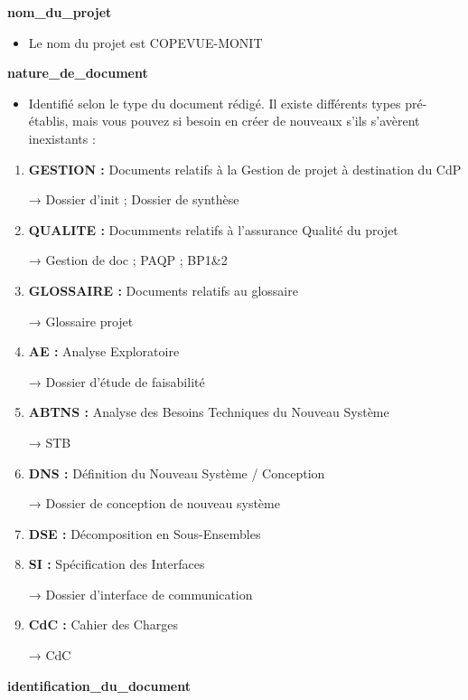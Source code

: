 \documentclass{mise_en_page}
\begin{document}
\textbf{nom\_du\_projet}

\begin{itemize}
\item Le nom du projet est COPEVUE-MONIT
\end{itemize}



\textbf{nature\_de\_document}

\begin{itemize}
\item Identifié selon le type du document rédigé. Il existe différents
types pré-établis, mais vous pouvez si besoin en créer de nouveaux
s’ils s’avèrent inexistants :
\end{itemize}
\begin{enumerate}
\item \textbf{GESTION :} Documents relatifs à la Gestion de projet à destination
du CdP

→ Dossier d’init ; Dossier de synthèse
\item \textbf{QUALITE :} Documments relatifs à l’assurance Qualité du projet

→ Gestion de doc ; PAQP ; BP1\&2

\item \textbf{GLOSSAIRE :} Documents relatifs au glossaire

→ Glossaire projet

\item \textbf{AE :} Analyse Exploratoire

→ Dossier d’étude de faisabilité

\item \textbf{ABTNS :} Analyse des Besoins Techniques du Nouveau Système

→ STB

\item \textbf{DNS :} Définition du Nouveau Système / Conception

→ Dossier de conception de nouveau système

\item \textbf{DSE :} Décomposition en Sous-Ensembles
\item \textbf{SI :} Spécification des Interfaces

→ Dossier d’interface de communication
\item \textbf{CdC :}  Cahier des Charges

→ CdC

\end{enumerate}

\textbf{identification\_du\_document}
\end{document}
